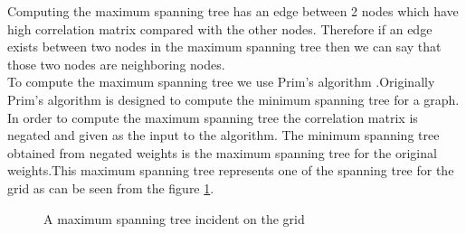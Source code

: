 Computing the maximum spanning tree has an edge between 2 nodes which have high correlation matrix compared with the other nodes. Therefore if an edge exists between two nodes in the maximum spanning tree then we can say that those two nodes are neighboring nodes.\\
To compute the maximum spanning tree we use Prim's algorithm \cite{BLTJ:BLTJ1515}.Originally  Prim's algorithm is designed to compute the minimum spanning tree for a graph. In order to compute the maximum spanning tree the correlation matrix is negated and given as the input to the algorithm. The minimum spanning tree obtained from negated weights is the maximum spanning tree for the original weights.This maximum spanning tree represents one of the spanning tree for the grid as can be seen from the figure \ref{fig:MST}. 

\begin{figure}
\qquad \qquad \qquad
{}
\caption{A maximum spanning tree incident on the grid}
\label{fig:MST}
\end{figure}

